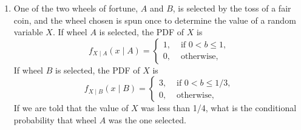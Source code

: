 \documentclass[paper=usletter, fontsize=12pt]{article}
\begin{document}
\begin{enumerate}
        \item One of the two wheels of fortune, $A$ and $B$, is selected by the
        toss of a fair coin, and the wheel chosen is spun once to determine the
        value of a random variable $X$. If wheel $A$ is selected, the PDF of
        $X$ is
        \begin{equation*}
            f_{X\mid A}(x\mid A) = \begin{cases}
                1, & \text{ if } 0 < b \le 1,\\
                0, & \text{ otherwise, }
            \end{cases}
        \end{equation*}
        If wheel $B$ is selected, the PDF of $X$ is
        \begin{equation*}
            f_{X\mid B}(x\mid B) = \begin{cases}
                3, & \text{ if } 0 < b \le 1/3,\\
                0, & \text{ otherwise, }
            \end{cases}
        \end{equation*}
        If we are told that the value of $X$ was less than 1/4, what is the
        conditional probability that wheel $A$ was the one selected.
        \begin{cproof}
        \end{cproof}

    \end{enumerate}
\end{document}

